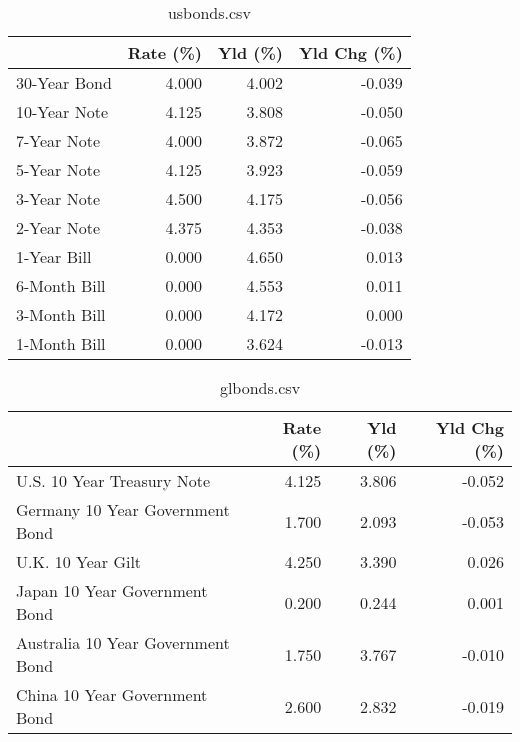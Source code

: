 \documentclass{article}%
\begin{document}
%


\begin{table}[htbp]%
\caption{usbonds.csv}%
\centering%
\begin{adjustbox}{width=1\textwidth}%
\begin{tabular}{lrrr}
\toprule
             &  Rate (\%) &  Yld (\%) &  Yld Chg (\%) \\
\midrule
30-Year Bond &     4.000 &    4.002 &       -0.039 \\
10-Year Note &     4.125 &    3.808 &       -0.050 \\
 7-Year Note &     4.000 &    3.872 &       -0.065 \\
 5-Year Note &     4.125 &    3.923 &       -0.059 \\
 3-Year Note &     4.500 &    4.175 &       -0.056 \\
 2-Year Note &     4.375 &    4.353 &       -0.038 \\
 1-Year Bill &     0.000 &    4.650 &        0.013 \\
6-Month Bill &     0.000 &    4.553 &        0.011 \\
3-Month Bill &     0.000 &    4.172 &        0.000 \\
1-Month Bill &     0.000 &    3.624 &       -0.013 \\
\bottomrule
\end{tabular}
%
\end{adjustbox}%
\end{table}

%


\begin{table}[htbp]%
\caption{glbonds.csv}%
\centering%
\begin{adjustbox}{width=1\textwidth}%
\begin{tabular}{lrrr}
\toprule
                                  &  Rate (\%) &  Yld (\%) &  Yld Chg (\%) \\
\midrule
       U.S. 10 Year Treasury Note &     4.125 &    3.806 &       -0.052 \\
  Germany 10 Year Government Bond &     1.700 &    2.093 &       -0.053 \\
                U.K. 10 Year Gilt &     4.250 &    3.390 &        0.026 \\
    Japan 10 Year Government Bond &     0.200 &    0.244 &        0.001 \\
Australia 10 Year Government Bond &     1.750 &    3.767 &       -0.010 \\
    China 10 Year Government Bond &     2.600 &    2.832 &       -0.019 \\
\bottomrule
\end{tabular}
%
\end{adjustbox}%
\end{table}
\end{document}
